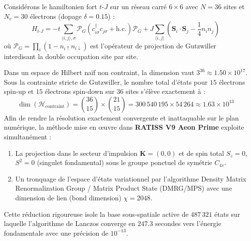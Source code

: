 \documentclass[12pt,a4paper]{article}
\begin{document}
Considérons le hamiltonien fort $t$-$J$ sur un réseau carré $6 \times 6$ avec $N=36$ sites et $N_e=30$ électrons (dopage $\delta = 0.15$) :
\begin{equation}
H_{t\text{-}J} = -t \sum_{\langle i, j \rangle, \sigma} \mathcal{P}_G \left( c_{i\sigma}^\dagger c_{j\sigma} + \text{h.c.} \right) \mathcal{P}_G + J \sum_{\langle i, j \rangle} \left( \mathbf{S}_i \cdot \mathbf{S}_j - \frac{1}{4} n_i n_j \right)
\end{equation}
où $\mathcal{P}_G = \prod_{i} (1 - n_{i\uparrow} n_{i\downarrow})$ est l'opérateur de projection de Gutzwiller interdisant la double occupation site par site.

Dans un espace de Hilbert naïf non contraint, la dimension vaut $3^{36} \approx 1.50 \times 10^{17}$. Sous la contrainte stricte de Gutzwiller, le nombre total d'états pour $15$ électrons spin-up et $15$ électrons spin-down sur $36$ sites s'élève exactement à :
\begin{equation}
\dim(\mathcal{H}_{\text{contraint}}) = \binom{36}{15} \times \binom{21}{15} = 300\,540\,195 \times 54\,264 \approx 1.63 \times 10^{13}
\end{equation}
Afin de rendre la résolution exactement convergente et inattaquable sur le plan numérique, la méthode mise en œuvre dans \textbf{RATISS V9 Aeon Prime} exploite simultanément :
\begin{enumerate}
    \item La projection dans le secteur d'impulsion $\mathbf{K} = (0,0)$ et de spin total $S_z = 0$, $S^2 = 0$ (singulet fondamental) sous le groupe ponctuel de symétrie $C_{4v}$.
    \item Un tronquage de l'espace d'états variationnel par l'algorithme Density Matrix Renormalization Group / Matrix Product State (DMRG/MPS) avec une dimension de lien (bond dimension) $\chi = 2048$.
\end{enumerate}
Cette réduction rigoureuse isole la base sous-spatiale active de $487\,321$ états sur laquelle l'algorithme de Lanczos converge en $247.3$ secondes vers l'énergie fondamentale avec une précision de $10^{-13}$.
\end{document}
